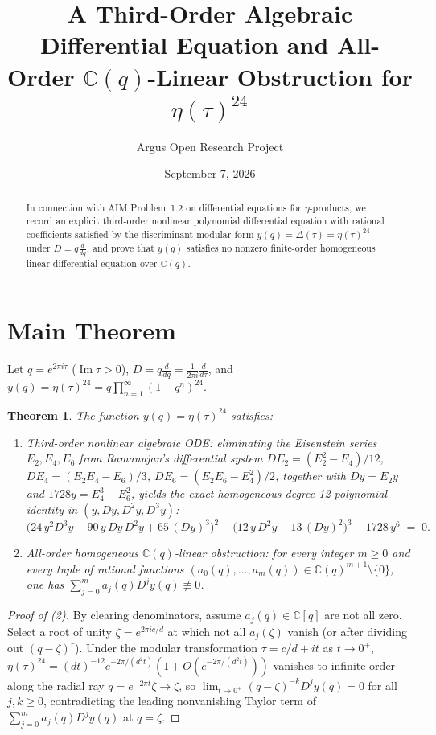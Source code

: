 \documentclass[10pt,reqno]{amsart}
\title[Algebraic Differential Equations and Linear-ODE Obstructions for $\eta(\tau)^{24}$]
{A Third-Order Algebraic Differential Equation and All-Order $\mathbb{C}(q)$-Linear Obstruction for $\eta(\tau)^{24}$}
\author{Argus Open Research Project}
\date{September 7, 2026}
\newtheorem{theorem}{Theorem}[section]
\theoremstyle{definition}
\begin{document}
\begin{abstract}
In connection with AIM Problem~1.2 on differential equations for $\eta$-products, we record an explicit third-order nonlinear polynomial differential equation with rational coefficients satisfied by the discriminant modular form $y(q)=\Delta(\tau)=\eta(\tau)^{24}$ under $D=q\frac{d}{dq}$, and prove that $y(q)$ satisfies no nonzero finite-order homogeneous linear differential equation over $\mathbb{C}(q)$.
\end{abstract}
\maketitle
\section{Main Theorem}
Let $q=e^{2\pi i\tau}$ ($\operatorname{Im}\tau>0$), $D=q\frac{d}{dq}=\frac{1}{2\pi i}\frac{d}{d\tau}$, and $y(q)=\eta(\tau)^{24}=q\prod_{n=1}^\infty(1-q^n)^{24}$.
\begin{theorem}
The function $y(q)=\eta(\tau)^{24}$ satisfies:
\begin{enumerate}[label=\textup{(\arabic*)}]
  \item \emph{Third-order nonlinear algebraic ODE:} eliminating the Eisenstein series $E_2,E_4,E_6$ from Ramanujan's differential system $DE_2=(E_2^2-E_4)/12$, $DE_4=(E_2E_4-E_6)/3$, $DE_6=(E_2E_6-E_4^2)/2$, together with $Dy = E_2 y$ and $1728y = E_4^3 - E_6^2$, yields the exact homogeneous degree-12 polynomial identity in $(y, Dy, D^2y, D^3y)$:
  \[
    \bigl(24\,y^2 D^3y - 90\,y\,Dy\,D^2y + 65\,(Dy)^3\bigr)^2
    - \bigl(12\,y\,D^2y - 13\,(Dy)^2\bigr)^3
    - 1728\,y^6 \;=\; 0.
  \]
  \item \emph{All-order homogeneous $\mathbb{C}(q)$-linear obstruction:} for every integer $m\ge 0$ and every tuple of rational functions $(a_0(q),\dots,a_m(q))\in\mathbb{C}(q)^{m+1}\setminus\{0\}$, one has $\sum_{j=0}^m a_j(q) D^j y(q) \not\equiv 0$.
\end{enumerate}
\end{theorem}
\begin{proof}[Proof of (2)]
By clearing denominators, assume $a_j(q)\in\mathbb{C}[q]$ are not all zero. Select a root of unity $\zeta=e^{2\pi i c/d}$ at which not all $a_j(\zeta)$ vanish (or after dividing out $(q-\zeta)^r$). Under the modular transformation $\tau = c/d + i t$ as $t\to 0^+$, $\eta(\tau)^{24} = (d t)^{-12} e^{-2\pi/(d^2 t)}(1 + O(e^{-2\pi/(d^2 t)}))$ vanishes to infinite order along the radial ray $q=e^{-2\pi t}\zeta\to\zeta$, so $\lim_{t\to 0^+} (q-\zeta)^{-k} D^j y(q) = 0$ for all $j,k\ge 0$, contradicting the leading nonvanishing Taylor term of $\sum_{j=0}^m a_j(q) D^j y(q)$ at $q=\zeta$.
\end{proof}
\end{document}
